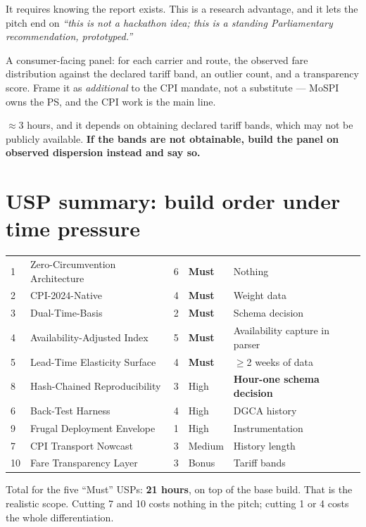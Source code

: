  It requires knowing the report exists. This is a research
advantage, and it lets the pitch end on \emph{``this is not a hackathon idea; this is a
standing Parliamentary recommendation, prototyped.''}

 A consumer-facing panel: for each carrier and route, the observed
fare distribution against the declared tariff band, an outlier count, and a transparency
score. Frame it as \emph{additional} to the CPI mandate, not a substitute --- MoSPI owns the
PS, and the CPI work is the main line.

 $\approx$3 hours, and it depends on obtaining declared tariff bands, which
may not be publicly available. \textbf{If the bands are not obtainable, build the panel on
observed dispersion instead and say so.}

\section{USP summary: build order under time pressure}

\begin{center}
\footnotesize
\begin{tabularx}{\textwidth}{@{}C{0.7cm} L{4.6cm} C{1.5cm} C{1.7cm} X@{}}
\toprule
\bhead{\#} &  &  &  &  \\
 & Zero-Circumvention Architecture & 6 & \textbf{Must} & Nothing \\
2 & CPI-2024-Native & 4 & \textbf{Must} & Weight data \\
3 & Dual-Time-Basis & 2 & \textbf{Must} & Schema decision \\
4 & Availability-Adjusted Index & 5 & \textbf{Must} & Availability capture in parser \\
5 & Lead-Time Elasticity Surface & 4 & \textbf{Must} & $\ge$2 weeks of data \\
8 & Hash-Chained Reproducibility & 3 & High & \textbf{Hour-one schema decision} \\
6 & Back-Test Harness & 4 & High & DGCA history \\
9 & Frugal Deployment Envelope & 1 & High & Instrumentation \\
7 & CPI Transport Nowcast & 3 & Medium & History length \\
10 & Fare Transparency Layer & 3 & Bonus & Tariff bands \\
\bottomrule
\end{tabularx}
\end{center}

\noindent Total for the five ``Must'' USPs: \textbf{21 hours}, on top of the base build. That
is the realistic scope. Cutting 7 and 10 costs nothing in the pitch; cutting 1 or 4 costs the
whole differentiation.
